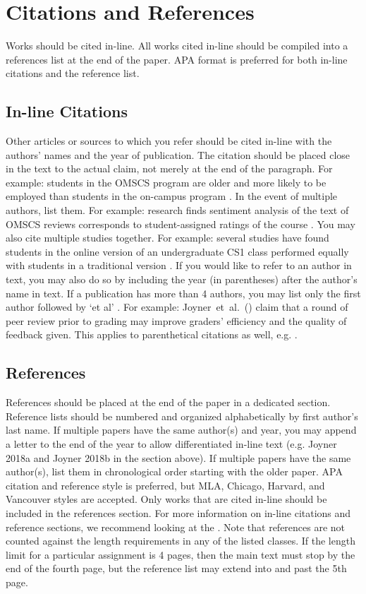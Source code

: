 {{{{\section*{Citations and References}
Works should be cited in-line. All works cited in-line should be compiled into a
references list at the end of the paper. APA format is preferred for both
in-line citations and the reference list.

\subsection*{In-line Citations}
Other articles or sources to which you refer should be cited in-line with the
authors' names and the year of publication. The citation should be placed close
in the text to the actual claim, not merely at the end of the paragraph. For
example: students in the OMSCS program are older and more likely to be employed
than students in the on-campus program \citep{Joyner17}. In the event of
multiple authors, list them. For example: research finds sentiment analysis of
the text of OMSCS reviews corresponds to student-assigned ratings of the course
\citep{Newman18}. You may also cite multiple studies together. For example:
several studies have found students in the online version of an undergraduate
CS1 class performed equally with students in a traditional version
\citep{Joyner18a,Joyner18b,Joyner19}. If you would like to refer to an author in
text, you may also do so by including the year (in parentheses) after the
author's name in text. If a publication has more than 4 authors, you may list
only the first author followed by `et al' . For example:
Joyner~et~al.~(\citeyear{Joyner16}) claim that a round of peer review prior to
grading may improve graders' efficiency and the quality of feedback given. This
applies to parenthetical citations as well, e.g. \citep{Joyner16}.

\subsection*{References}
References should be placed at the end of the paper in a dedicated section.
Reference lists should be numbered and organized alphabetically by first
author's last name. If multiple papers have the same author(s) and year, you may
append a letter to the end of the year to allow differentiated in-line text
(e.g. Joyner 2018a and Joyner 2018b in the section above). If multiple papers
have the same author(s), list them in chronological order starting with the
older paper. APA citation and reference style is preferred, but MLA, Chicago,
Harvard, and Vancouver styles are accepted. Only works that are cited in-line
should be included in the references section. For more information on in-line
citations and reference sections, we recommend looking at the
. Note that references are not counted against the length requirements in
any of the listed classes. If the length limit for a particular assignment is 4
pages, then the main text must stop by the end of the fourth page, but the
reference list may extend into and past the 5th page.


}}}}
